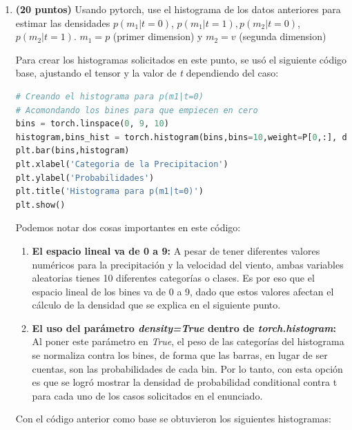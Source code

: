 \documentclass[spanish,english]{article}
\begin{document}
\begin{enumerate}

\item \textbf{(20 puntos)} Usando pytorch, use el histograma de los datos
anteriores para estimar las densidades $p\left(m_{1}|t=0\right)$,
$p\left(m_{1}|t=1\right),$$p\left(m_{2}|t=0\right)$, $p\left(m_{2}|t=1\right)$.
$m_{1}=p$ (primer dimension) y $m_{2}=v$ (segunda dimension)

Para crear los histogramas solicitados en este punto, se us\'{o} el siguiente c\'{o}digo base, ajustando el tensor y la valor de \textit{t} dependiendo del caso:

\begin{lstlisting}[language=Python]
# Creando el histograma para p(m1|t=0)
# Acomondando los bines para que empiecen en cero
bins = torch.linspace(0, 9, 10)
histogram,bins_hist = torch.histogram(bins,bins=10,weight=P[0,:], density=True)
plt.bar(bins,histogram)
plt.xlabel('Categoria de la Precipitacion')
plt.ylabel('Probabilidades')
plt.title('Histograma para p(m1|t=0)')
plt.show()
\end{lstlisting}

Podemos notar dos cosas importantes en este c\'{o}digo:
\begin{enumerate}
    \item \textbf{El espacio lineal va de 0 a 9:} A pesar de tener diferentes valores num\'{e}ricos para la precipitaci\'{o}n y la velocidad del viento, ambas variables aleatorias tienes 10 diferentes categor\'{i}as o clases. Es por eso que el espacio lineal de los bines va de 0 a 9, dado que estos valores afectan el c\'{a}lculo de la densidad que se explica en el siguiente punto.
    \item \textbf{El uso del par\'{a}metro \textit{density=True} dentro de \textit{torch.histogram}:} Al poner este par\'{a}metro en \textit{True}, el peso de las categor\'{i}as del histograma se normaliza contra los bines, de forma que las barras, en lugar de ser cuentas, son las probabilidades de cada bin. Por lo tanto, con esta opci\'{o}n es que se logr\'{o} mostrar la densidad de probabilidad conditional contra t para cada uno de los casos solicitados en el enunciado.
\end{enumerate}

Con el c\'{o}digo anterior como base se obtuvieron los siguientes histogramas:


\end{enumerate}
\end{document}
